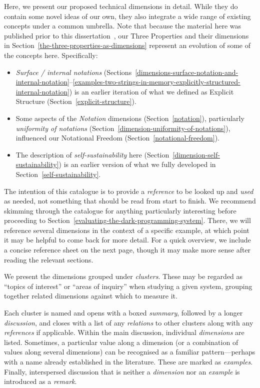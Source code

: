 \documentclass[ twoside,openright,titlepage,numbers=noenddot,headinclude,footinclude,cleardoublepage=empty,abstract=on,
                BCOR=5mm,paper=a4,fontsize=11pt
                ]{scrreprt}
\providecommand{\tightlist}{}\newenvironment{longtable}[2]{\begin{tabular}}{\end{tabular}}
\theoremstyle{definition}
\begin{document}
Here, we present our proposed technical dimensions in detail. While they
do contain some novel ideas of our own, they also integrate a wide range
of existing concepts under a common umbrella. Note that because the
material here was published prior to this
dissertation~\parencite{TechDims}, our Three Properties and their
dimensions in Section~\ref{the-three-properties-as-dimensions} represent
an evolution of some of the concepts here. Specifically:

\begin{itemize}
\tightlist
\item
  \emph{Surface / internal notations}
  (Sections~\ref{dimensions-surface-notation-and-internal-notation}--\ref{examples-two-strings-in-memory-explicitly-structured-internal-notation})
  is an earlier iteration of what we defined as Explicit Structure
  (Section~\ref{explicit-structure}).
\item
  Some aspects of the \emph{Notation} dimensions
  (Section~\ref{notation}), particularly \emph{uniformity of notations}
  (Section~\ref{dimension-uniformity-of-notations}), influenced our
  Notational Freedom (Section~\ref{notational-freedom}).
\item
  The description of \emph{self-sustainability} here
  (Section~\ref{dimension-self-sustainability}) is an earlier version of
  what we fully developed in Section~\ref{self-sustainability}.
\end{itemize}

The intention of this catalogue is to provide a \emph{reference} to be
looked up and \emph{used} as needed, not something that should be read
from start to finish. We recommend skimming through the catalogue for
anything particularly interesting before proceeding to
Section~\ref{evaluating-the-dark-programming-system}. There, we will
reference several dimensions in the context of a specific example, at
which point it may be helpful to come back for more detail. For a quick
overview, we include a concise reference sheet on the next page, though
it may make more sense after reading the relevant sections.

We present the dimensions grouped under \emph{clusters}. These may be
regarded as ``topics of interest'' or ``areas of inquiry'' when studying
a given system, grouping together related dimensions against which to
measure it.

Each cluster is named and opens with a boxed \emph{summary}, followed by
a longer \emph{discussion}, and closes with a list of any
\emph{relations} to other clusters along with any \emph{references} if
applicable. Within the main discussion, individual \emph{dimensions} are
listed. Sometimes, a particular value along a dimension (or a
combination of values along several dimensions) can be recognised as a
familiar pattern---perhaps with a name already established in the
literature. These are marked as \emph{examples}. Finally, interspersed
discussion that is neither a \emph{dimension} nor an \emph{example} is
introduced as a \emph{remark}.
\end{document}
